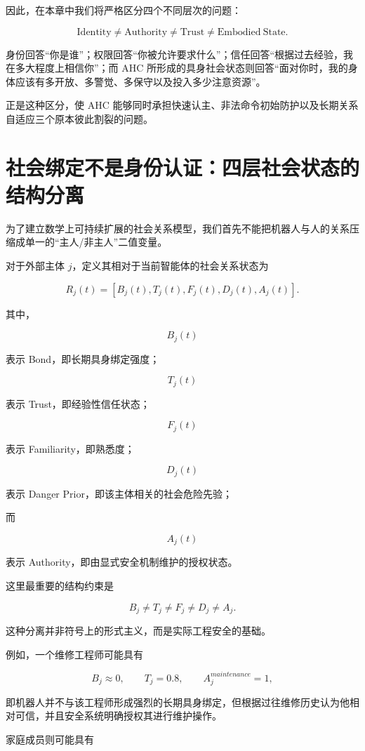 因此，在本章中我们将严格区分四个不同层次的问题：

\[
\mathrm{Identity}
\neq
\mathrm{Authority}
\neq
\mathrm{Trust}
\neq
\mathrm{Embodied\ State}.
\]

身份回答“你是谁”；权限回答“你被允许要求什么”；信任回答“根据过去经验，我在多大程度上相信你”；而 AHC 所形成的具身社会状态则回答“面对你时，我的身体应该有多开放、多警觉、多保守以及投入多少注意资源”。

正是这种区分，使 AHC 能够同时承担快速认主、非法命令初始防护以及长期关系自适应三个原本彼此割裂的问题。


\section{社会绑定不是身份认证：四层社会状态的结构分离}

为了建立数学上可持续扩展的社会关系模型，我们首先不能把机器人与人的关系压缩成单一的“主人/非主人”二值变量。

对于外部主体 $j$，定义其相对于当前智能体的社会关系状态为

\[
R_j(t)
=
\left[
B_j(t),
T_j(t),
F_j(t),
D_j(t),
A_j(t)
\right].
\]

其中，

\[
B_j(t)
\]

表示 Bond，即长期具身绑定强度；

\[
T_j(t)
\]

表示 Trust，即经验性信任状态；

\[
F_j(t)
\]

表示 Familiarity，即熟悉度；

\[
D_j(t)
\]

表示 Danger Prior，即该主体相关的社会危险先验；

而

\[
A_j(t)
\]

表示 Authority，即由显式安全机制维护的授权状态。

这里最重要的结构约束是

\[
\boxed{
B_j\neq T_j\neq F_j\neq D_j\neq A_j.
}
\]

这种分离并非符号上的形式主义，而是实际工程安全的基础。

例如，一个维修工程师可能具有

\[
B_j\approx 0,
\qquad
T_j=0.8,
\qquad
A_j^{maintenance}=1,
\]

即机器人并不与该工程师形成强烈的长期具身绑定，但根据过往维修历史认为他相对可信，并且安全系统明确授权其进行维护操作。

家庭成员则可能具有

